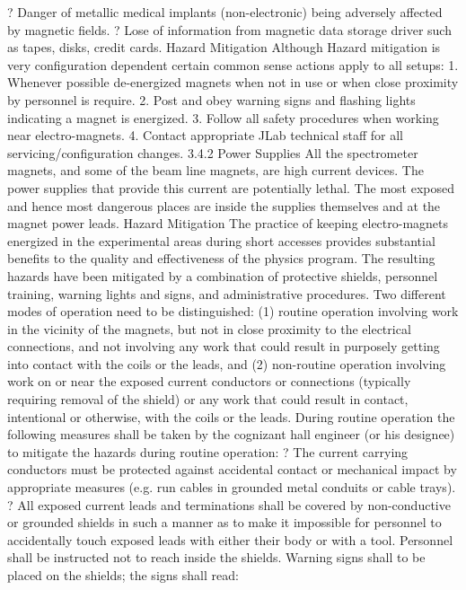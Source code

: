 {{{	? 	Danger of metallic medical implants (non-electronic) being adversely affected
 			by magnetic fields.
	? 	Lose of information from magnetic data storage driver such as tapes, disks, 
			credit cards.
Hazard Mitigation
Although Hazard mitigation is very configuration dependent certain common sense actions apply to all setups:
 1. Whenever possible de-energized magnets when not in use or when close proximity by personnel is require.
	2. Post and obey warning signs and flashing lights indicating a magnet is energized.
	3. Follow all safety procedures when working near electro-magnets.
	4. Contact appropriate JLab technical staff for all servicing/configuration changes.
3.4.2		Power Supplies 
	All the spectrometer magnets, and some of the beam line magnets, are high current devices. The power supplies that provide this current are potentially lethal. The most exposed and hence most dangerous places are inside the supplies themselves and at the magnet power leads.
Hazard Mitigation	
	The practice of keeping electro-magnets energized in the experimental areas during short accesses provides substantial benefits to the quality and effectiveness of the physics program. The resulting hazards have been mitigated by a combination of protective shields, personnel training, warning lights and signs, and administrative procedures. Two different modes of operation need to be distinguished: (1) routine operation involving work in the vicinity of the magnets, but not in close proximity to the electrical connections, and not involving any work that could result in purposely getting into contact with the coils or the leads, and (2) non-routine operation involving work on or near the exposed current conductors or connections (typically requiring removal of the shield) or any work that could result in contact, intentional or otherwise, with the coils or the leads.
	During routine operation the following measures shall be taken by the cognizant hall engineer (or his designee) to mitigate the hazards during routine operation:
? 	The current carrying conductors must be protected against accidental contact or
  	mechanical impact by appropriate measures (e.g. run cables in grounded metal
 	conduits or cable trays).
	? 	All exposed current leads and terminations shall be covered by non-conductive
			or grounded shields in such a manner as to make it impossible for personnel to
 			accidentally touch exposed leads with either their body or with a tool. Personnel
 			shall be instructed not to reach inside the shields. Warning signs shall to be
 			placed on the shields; the signs shall read:
}}}
